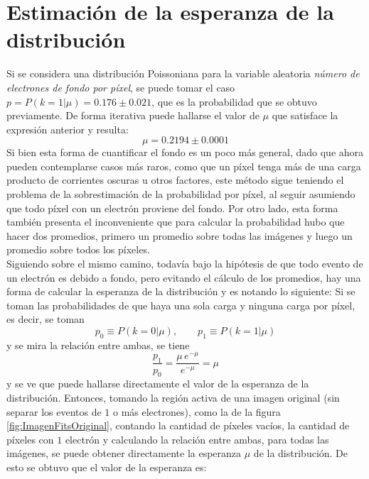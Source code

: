 \section{Estimación de la esperanza de la distribución}
\noindent Si se considera una distribución Poissoniana para la variable aleatoria \textit{número de electrones de fondo por píxel}, se puede tomar el caso $p = P(k = 1 | \mu) = 0.176 \pm 0.021$, que es la probabilidad que se obtuvo previamente. De forma iterativa puede hallarse el valor de $\mu$ que satisface la expresión anterior y resulta:
\begin{equation*}
    \mu = 0.2194 \pm 0.0001
\end{equation*}
Si bien esta forma de cuantificar el fondo es un poco más general, dado que ahora pueden contemplarse casos más raros, como que un píxel tenga más de una carga producto de corrientes oscuras u otros factores, este método sigue teniendo el problema de la sobrestimación de la probabilidad por píxel, al seguir asumiendo que todo píxel con un electrón proviene del fondo. Por otro lado, esta forma también presenta el inconveniente que para calcular la probabilidad hubo que hacer dos promedios, primero un promedio sobre todas las imágenes y luego un promedio sobre todos los píxeles.\\
\indent Siguiendo sobre el mismo camino, todavía bajo la hipótesis de que todo evento de un electrón es debido a fondo, pero evitando el cálculo de los promedios, hay una forma de calcular la esperanza de la distribución y es notando lo siguiente: Si se toman las probabilidades de que haya una sola carga y ninguna carga por píxel, es decir, se toman
\begin{equation*}
    p_{0} \equiv P(k = 0 | \mu),
    \quad
    \quad
    p_{1} \equiv P(k = 1 | \mu)
\end{equation*}
y se mira la relación entre ambas, se tiene
\begin{equation*}
    \frac{p_{1}}{p_{0}} = \frac{\mu\,e^{-\mu}}{e^{-\mu}} = \mu
\end{equation*}
y se ve que puede hallarse directamente el valor de la esperanza de la distribución. Entonces, tomando la región activa de una imagen original (sin separar los eventos de $1$ o más electrones), como la de la figura \ref{fig:ImagenFitsOriginal}, contando la cantidad de píxeles vacíos, la cantidad de píxeles con $1$ electrón y calculando la relación entre ambas, para todas las imágenes, se puede obtener directamente la esperanza $\mu$ de la distribución. De esto se obtuvo que el valor de la esperanza es:
